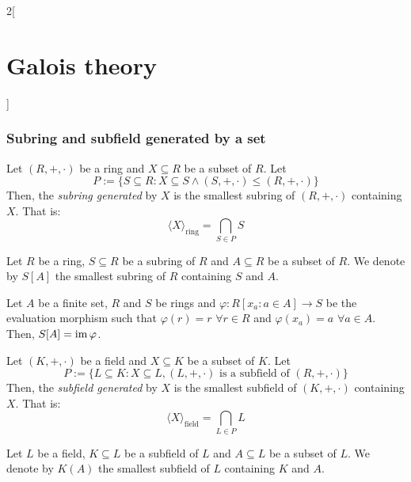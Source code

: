 \documentclass[../../../main.tex]{subfiles}
\begin{document}
\begin{multicols}{2}[\section{Galois theory}]
  \subsubsection{Subring and subfield generated by a set}
  \begin{definition}
    Let $(R,+,\cdot)$ be a ring and $X\subseteq R$ be a subset of $R$. Let $$P:=\{S\subseteq R: X\subseteq S\land(S,+,\cdot)\leq(R,+,\cdot)\}$$ Then, the \emph{subring generated} by $X$ is the smallest subring of $(R,+,\cdot)$ containing $X$. That is: $$\langle X\rangle_\text{ring}=\bigcap_{S\in P}S$$
  \end{definition}
  \begin{definition}
    Let $R$ be a ring, $S\subseteq R$ be a subring of $R$ and $A\subseteq R$ be a subset of $R$. We denote by $S[A]$ the smallest subring of $R$ containing $S$ and $A$.
  \end{definition}
  \begin{lemma}
    Let $A$ be a finite set, $R$ and $S$ be rings and $\varphi:R[x_a:a\in A]\rightarrow S$ be the evaluation morphism such that $\varphi(r)=r$ $\forall r\in R$ and $\varphi(x_a)=a$ $\forall a\in A$. Then, $S[A]=\operatorname{im}\varphi$.
  \end{lemma}
  \begin{definition}
    Let $(K,+,\cdot)$ be a field and $X\subseteq K$ be a subset of $K$. Let $$P:=\{L\subseteq K: X\subseteq L,(L,+,\cdot)\text{ is a subfield of }(R,+,\cdot)\}$$ Then, the \emph{subfield generated} by $X$ is the smallest subfield of $(K,+,\cdot)$ containing $X$. That is: $$\langle X\rangle_\text{field}=\bigcap_{L\in P}L$$
  \end{definition}
  \begin{definition}
    Let $L$ be a field, $K\subseteq L$ be a subfield of $L$ and $A\subseteq L$ be a subset of $L$. We denote by $K(A)$ the smallest subfield of $L$ containing $K$ and $A$.
  \end{definition}

\end{multicols}
\end{document}
